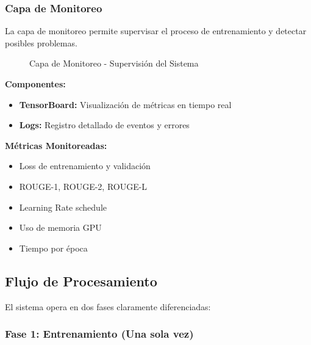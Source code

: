 \documentclass[12pt,a4paper]{article}
\begin{document}
\newpage

\subsubsection{Capa de Monitoreo}

La capa de monitoreo permite supervisar el proceso de entrenamiento y detectar posibles problemas.

\begin{figure}[H]
    \centering
    \caption{Capa de Monitoreo - Supervisión del Sistema}
    \label{fig:capa_monitoreo}
\end{figure}

\textbf{Componentes:}
\begin{itemize}
    \item \textbf{TensorBoard:} Visualización de métricas en tiempo real
    \item \textbf{Logs:} Registro detallado de eventos y errores
\end{itemize}

\textbf{Métricas Monitoreadas:}
\begin{itemize}
    \item Loss de entrenamiento y validación
    \item ROUGE-1, ROUGE-2, ROUGE-L
    \item Learning Rate schedule
    \item Uso de memoria GPU
    \item Tiempo por época
\end{itemize}

\newpage

\subsection{Flujo de Procesamiento}

El sistema opera en dos fases claramente diferenciadas:

\subsubsection{Fase 1: Entrenamiento (Una sola vez)}
\end{document}
